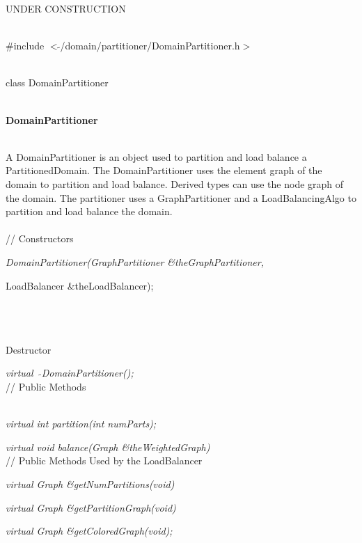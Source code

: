 
UNDER CONSTRUCTION

   \\
\#include $<\tilde{ }$/domain/partitioner/DomainPartitioner.h$>$  


  \\
class DomainPartitioner 


 \\
{\bf DomainPartitioner} 



  \\
\indent A DomainPartitioner is an object used to partition and load balance
a PartitionedDomain. The DomainPartitioner uses the element graph of
the domain to partition and load balance. Derived types can use the
node graph of the domain. The partitioner uses a GraphPartitioner and
a LoadBalancingAlgo to partition and load balance the domain. \\

  \\
 // Constructors  

{\em DomainPartitioner(GraphPartitioner \&theGraphPartitioner,

\indent\indent\indent	LoadBalancer \&theLoadBalancer);} \\
\\ \\
Destructor  

{\em virtual~ $\tilde{}$DomainPartitioner();}  \\ 

// Public Methods  

\\
{\em virtual int partition(int numParts);}

{\em virtual void balance(Graph \&theWeightedGraph)} \\ 

// Public Methods Used by the LoadBalancer  

{\em virtual Graph \&getNumPartitions(void)} 

{\em virtual Graph \&getPartitionGraph(void)} 

{\em virtual Graph \&getColoredGraph(void); } 

